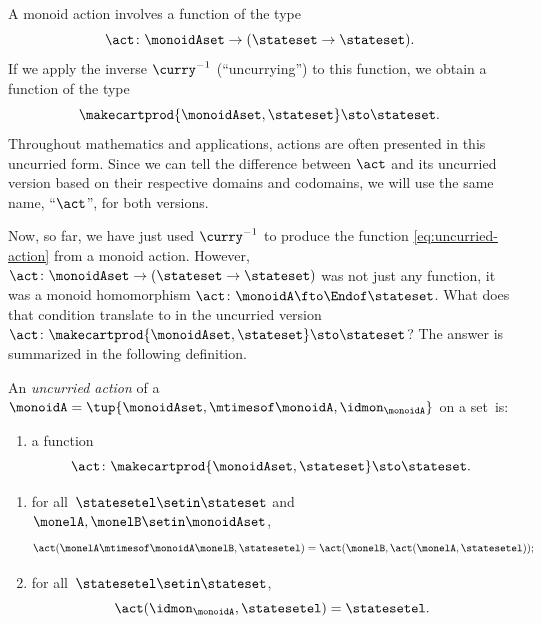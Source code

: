 A monoid action involves a function of the type
\begin{equation}
     \act \colon  \monoidAset \to (\stateset \to \stateset).
\end{equation}
If we apply the inverse $\curry^{-1}$ (``uncurrying'') to this function, 
we obtain a function of the type
\begin{equation}\label{eq:uncurried-action}
 \makecartprod{\monoidAset, \stateset} \sto \stateset.
 \end{equation}
Throughout mathematics and applications, actions are often presented in this uncurried form. 
Since we can tell the difference between $\act$ and its uncurried version based on their respective domains and codomains, we will use the same name, ``$\act$'', for both versions.


Now, so far, we have just used $\curry^{-1}$ to produce the function \cref{eq:uncurried-action} from a monoid action. However, $\act \colon  \monoidAset \to (\stateset \to \stateset)$ was not just any function, it was a monoid homomorphism $\act \colon \monoidA \fto \Endof\stateset$. What does that condition translate to in the uncurried version $\act \colon  \makecartprod{\monoidAset, \stateset} \sto \stateset$? The answer is summarized in the following definition.

\begin{ctdefinition}
\label{def:uncurried-action}
   
    An \emph{uncurried action} of a ~$\monoidA = \tup{\monoidAset, \mtimesof\monoidA, \idmon_\monoidA}$ on a set~\stateset is:
    
    \constit
    \begin{enumerate}
        \item a function
              \begin{equation}
                  \label{eq:ract-monoid}
                  \act \colon \makecartprod{\monoidAset, \stateset} \sto \stateset.
              \end{equation}
    \end{enumerate}
    \condit
    \begin{enumerate}
        \item for all~$\statesetel \setin \stateset$ and $\monelA,\monelB\setin\monoidAset$,
              \begin{equation}
                  \label{eq:monoiad-ract-1cond}
                  \act(\monelA \mtimesof\monoidA \monelB, \statesetel) = \act(\monelB, \act(\monelA, \statesetel));
              \end{equation}
        \item for all~$\statesetel \setin \stateset$,
              \begin{equation}
                  \label{eq:monoiad-ract-2cond}
                  \act(\idmon_\monoidA, \statesetel) = \statesetel.
              \end{equation}
    \end{enumerate}
\end{ctdefinition}

